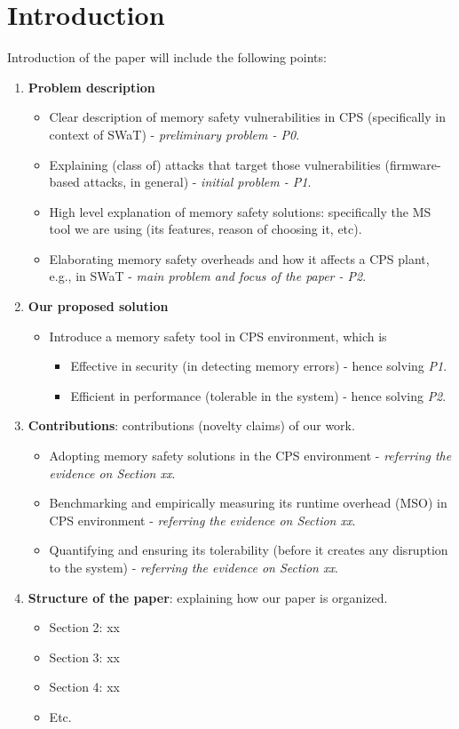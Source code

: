 \documentclass{acm_proc_article-sp}
\begin{document}
\section{Introduction}\label{sec:introduction}
Introduction of the paper will include the following points:
\begin{enumerate}
\item \textbf{Problem description}
\begin{itemize}
\item Clear description of memory safety vulnerabilities in CPS (specifically in context of SWaT) - \emph{preliminary problem - P0}.
\item Explaining (class of) attacks that target those vulnerabilities (firmware-based attacks, in general) - \emph{initial problem - P1}.
\item High level explanation of memory safety solutions: specifically the MS tool we are using (its features, reason of choosing it, etc). 
\item Elaborating memory safety overheads and how it affects a CPS plant, e.g., in SWaT - \emph{main problem and focus of the paper - P2}.
\end{itemize}
\item \textbf{Our proposed solution} 
\begin{itemize}
\item Introduce a memory safety tool in CPS environment, which is
\begin{itemize}
\item Effective in security (in detecting memory errors) - hence solving \emph{P1}.
\item Efficient in performance (tolerable in the system) - hence solving \emph{P2}.
\end{itemize}
\end{itemize}
\item \textbf{Contributions}: contributions (novelty claims) of our work. 
\begin{itemize}
\item Adopting memory safety solutions in the CPS environment - \emph{referring the evidence on Section xx}.
\item Benchmarking and empirically measuring its runtime overhead (MSO) in CPS environment - \emph{referring the evidence on Section xx}.
\item Quantifying and ensuring its tolerability (before it creates any disruption to the system) - \emph{referring the evidence on Section xx}.
\end{itemize}

\item \textbf{Structure of the paper}: explaining how our paper is organized. 
\begin{itemize}
\item Section 2: xx
\item Section 3: xx
\item Section 4: xx
\item Etc.
\end{itemize}
\end{enumerate}
\end{document}
